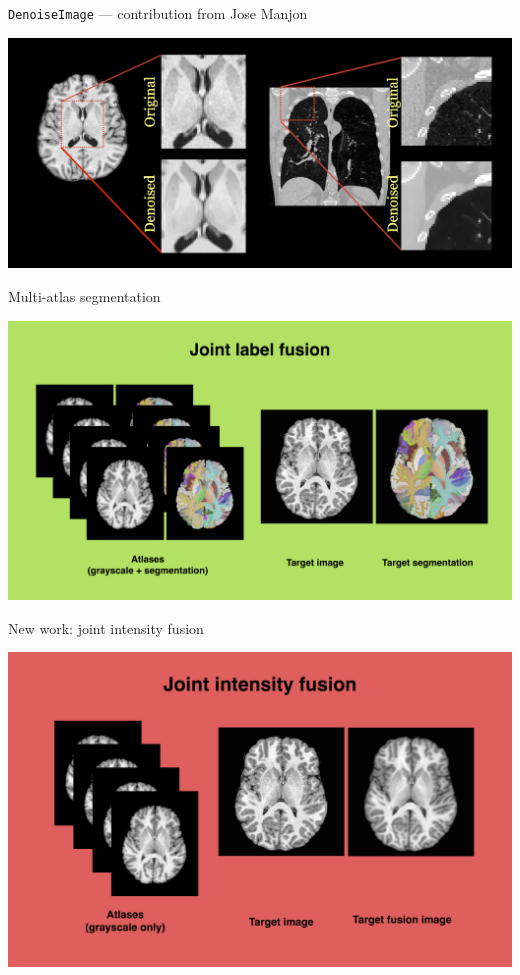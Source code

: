 \documentclass[ignorenonframetext,]{beamer}
\begin{document}
\begin{frame}{\texttt{DenoiseImage} --- contribution from Jose Manjon}

\includegraphics{./tools/figures/denoising.png}

\end{frame}

\begin{frame}{Multi-atlas segmentation}

\includegraphics{./tools/jointfusion/figures/jointLabelFusion.png}

\end{frame}

\begin{frame}{New work: joint intensity fusion}

\includegraphics{./tools/jointfusion/figures/jointIntensityFusion.png}

\end{frame}
\end{document}
